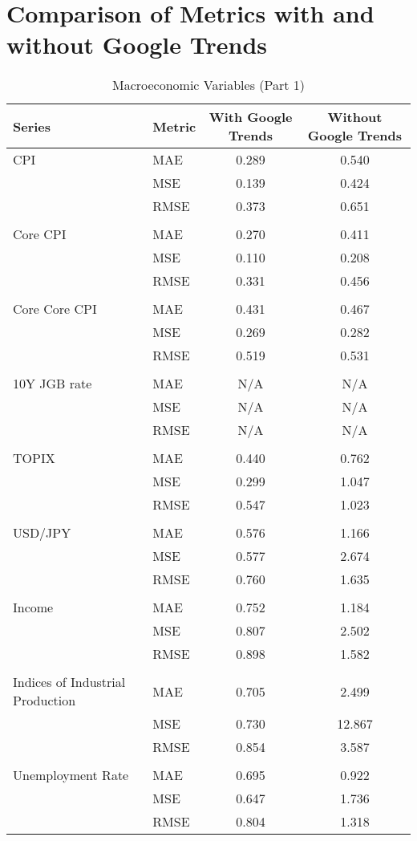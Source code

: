 \documentclass[a4paper,12pt]{article}
\begin{document}
\section*{Comparison of Metrics with and without Google Trends}

\begin{table}
\caption{Macroeconomic Variables (Part 1)}
\label{tab:metrics_comparison_Macroeconomic_Variables_(Part_1)}
\begin{tabular}{llcc}
\toprule
Series & Metric & With Google Trends & Without Google Trends \\
\midrule
CPI & MAE & 0.289 & 0.540 \\
 & MSE & 0.139 & 0.424 \\
 & RMSE & 0.373 & 0.651 \\
\arrayrulecolor{black!30}\midrule &  &  &  \\
Core CPI & MAE & 0.270 & 0.411 \\
 & MSE & 0.110 & 0.208 \\
 & RMSE & 0.331 & 0.456 \\
\arrayrulecolor{black!30}\midrule &  &  &  \\
Core Core CPI & MAE & 0.431 & 0.467 \\
 & MSE & 0.269 & 0.282 \\
 & RMSE & 0.519 & 0.531 \\
\arrayrulecolor{black!30}\midrule &  &  &  \\
10Y JGB rate & MAE & N/A & N/A \\
 & MSE & N/A & N/A \\
 & RMSE & N/A & N/A \\
\arrayrulecolor{black!30}\midrule &  &  &  \\
TOPIX & MAE & 0.440 & 0.762 \\
 & MSE & 0.299 & 1.047 \\
 & RMSE & 0.547 & 1.023 \\
\arrayrulecolor{black!30}\midrule &  &  &  \\
USD/JPY & MAE & 0.576 & 1.166 \\
 & MSE & 0.577 & 2.674 \\
 & RMSE & 0.760 & 1.635 \\
\arrayrulecolor{black!30}\midrule &  &  &  \\
Income & MAE & 0.752 & 1.184 \\
 & MSE & 0.807 & 2.502 \\
 & RMSE & 0.898 & 1.582 \\
\arrayrulecolor{black!30}\midrule &  &  &  \\
Indices of Industrial Production & MAE & 0.705 & 2.499 \\
 & MSE & 0.730 & 12.867 \\
 & RMSE & 0.854 & 3.587 \\
\arrayrulecolor{black!30}\midrule &  &  &  \\
Unemployment Rate & MAE & 0.695 & 0.922 \\
 & MSE & 0.647 & 1.736 \\
 & RMSE & 0.804 & 1.318 \\
\bottomrule
\end{tabular}
\end{table}
\end{document}
